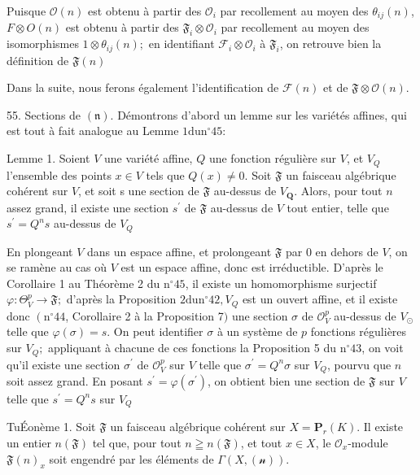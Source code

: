 Puisque $\mathcal{O}(n)$ est obtenu à partir des $\mathcal{O}_{i}$ par recollement au moyen des $\theta_{i j}(n)$, $F \otimes O(n)$ est obtenu à partir des $\mathfrak{F}_{i} \otimes \mathcal{O}_{i}$ par recollement au moyen des isomorphismes $1 \otimes \theta_{i j}(n) ;$ en identifiant $\mathcal{F}_{i} \otimes \mathcal{O}_{i}$ à $\mathfrak{F}_{i}$, on retrouve bien la définition de $\mathfrak{F}(n)$

Dans la suite, nous ferons également l'identification de $\mathcal{F}(n)$ et de $\mathfrak{F} \otimes \mathcal{O}(n)$.

55. Sections de $\mathfrak{( n )} .$ Démontrons d'abord un lemme sur les variétés affines, qui est tout à fait analogue au Lemme $1 \mathrm{du} \mathrm{n}^{\circ} 45:$

Lemme 1. Soient $V$ une variété affine, $Q$ une fonction régulière sur $V$, et $V_{Q}$ l'ensemble des points $x \in V$ tels que $Q(x) \neq 0 .$ Soit $\mathfrak{F}$ un faisceau algébrique cohérent sur $V$, et soit s une section de $\mathfrak{F}$ au-dessus de $V_{\mathbf{Q}} .$ Alors, pour tout $n$ assez grand, il existe une section $s^{\prime}$ de $\mathfrak{F}$ au-dessus de $V$ tout entier, telle que $s^{\prime}=Q^{n} s$ au-dessus de $V_{Q}$

En plongeant $V$ dans un espace affine, et prolongeant $\mathfrak{F}$ par 0 en dehors de $V$, on se ramène au cas où $V$ est un espace affine, donc est irréductible. D'après le Corollaire 1 au Théorème 2 du $\mathrm{n}^{\circ} 45$, il existe un homomorphisme surjectif $\varphi: \Theta_{V}^{p} \rightarrow \mathfrak{F} ;$ d'après la Proposition $2 \mathrm{du} \mathrm{n}^{\circ} 42, V_{Q}$ est un ouvert affine, et il existe donc $\left(\mathrm{n}^{\circ} 44\right.$, Corollaire 2 à la Proposition 7$)$ une section $\sigma$ de $\mathcal{O}_{V}^{p}$ au-dessus de $V_{\odot}$ telle que $\varphi(\sigma)=s .$ On peut identifier $\sigma$ à un système de $p$ fonctions régulières sur $V_{Q} ;$ appliquant à chacune de ces fonctions la Proposition 5 du $\mathrm{n}^{\circ} 43$, on voit qu'il existe une section $\sigma^{\prime}$ de $\mathcal{O}_{V}^{p}$ sur $V$ telle que $\sigma^{\prime}=Q^{n} \sigma$ sur $V_{Q}$, pourvu que $n$ soit assez grand. En posant $s^{\prime}=\varphi\left(\sigma^{\prime}\right)$, on obtient bien une section de $\mathfrak{F}$ sur $V$ telle que $s^{\prime}=Q^{n} s$ sur $V_{Q}$

TuÉonème 1. Soit $\mathfrak{F}$ un faisceau algébrique cohérent sur $X=\mathbf{P}_{r}(K) .$ Il existe un entier $n(\mathfrak{F})$ tel que, pour tout $n \geqq n(\mathfrak{F})$, et tout $x \in X$, le $\mathcal{O}_{x}$-module $\mathfrak{F}(n)_{x}$ soit engendré par les éléments de $\Gamma(X, \mathscr{( n )})$.

